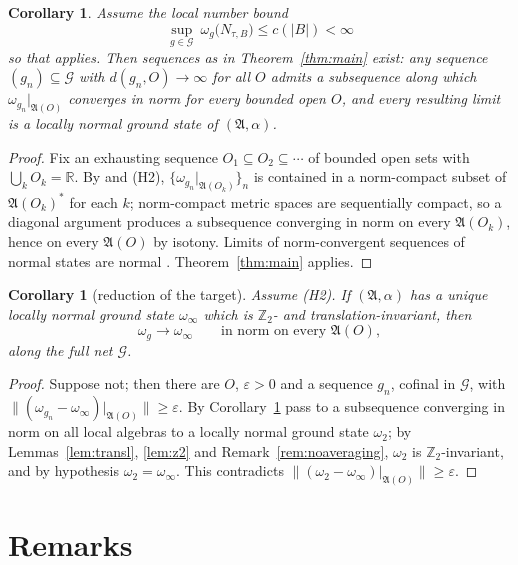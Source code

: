 \documentclass[11pt,a4paper]{article}
\theoremstyle{plain}
\newtheorem{corollary}[theorem]{Corollary}
\theoremstyle{definition}
\newcommand{\A}{\mathfrak{A}}
\newcommand{\G}{\mathcal{G}}
\newcommand{\R}{\mathbb{R}}
\newcommand{\Z}{\mathbb{Z}}
\begin{document}
\begin{corollary}\label{cor:exists}
Assume the local number bound
\[
  \sup_{g\in\G}\ \omega_g\bigl(N_{\tau,B}\bigr)\le c(|B|)<\infty \tag{H2}
\]
so that \cite[Thm.~2.3]{GJIII} applies. Then sequences as in Theorem~\ref{thm:main} exist: any
sequence $(g_n)\subseteq\G$ with $d(g_n,O)\to\infty$ for all $O$ admits a subsequence along which
$\omega_{g_n}|_{\A(O)}$ converges in norm for every bounded open $O$, and every resulting limit is
a locally normal ground state of $(\A,\alpha)$.
\end{corollary}

\begin{proof}
Fix an exhausting sequence $O_1\subseteq O_2\subseteq\cdots$ of bounded open sets with
$\bigcup_kO_k=\R$. By \cite[Thm.~2.3]{GJIII} and (H2), $\{\omega_{g_n}|_{\A(O_k)}\}_n$ is
contained in a norm-compact subset of $\A(O_k)^*$ for each $k$; norm-compact metric spaces are
sequentially compact, so a diagonal argument produces a subsequence converging in norm on every
$\A(O_k)$, hence on every $\A(O)$ by isotony. Limits of norm-convergent sequences of normal
states are normal \cite[Thm.~2.3]{GJIII}. Theorem~\ref{thm:main} applies.
\end{proof}

\begin{corollary}[reduction of the target]\label{cor:reduction}
Assume \textup{(H2)}. If $(\A,\alpha)$ has a \emph{unique} locally normal ground state
$\omega_\infty$ which is $\Z_2$- and translation-invariant, then
\[
  \omega_g\longrightarrow\omega_\infty\qquad\text{in norm on every }\A(O),
\]
along the full net $\G$.
\end{corollary}

\begin{proof}
Suppose not; then there are $O$, $\varepsilon>0$ and a sequence $g_n$, cofinal in $\G$, with
$\|(\omega_{g_n}-\omega_\infty)|_{\A(O)}\|\ge\varepsilon$. By Corollary~\ref{cor:exists} pass to a
subsequence converging in norm on all local algebras to a locally normal ground state
$\omega_2$; by Lemmas~\ref{lem:transl}, \ref{lem:z2} and Remark~\ref{rem:noaveraging}, $\omega_2$
is $\Z_2$-invariant, and by hypothesis $\omega_2=\omega_\infty$. This contradicts
$\|(\omega_2-\omega_\infty)|_{\A(O)}\|\ge\varepsilon$.
\end{proof}

\section{Remarks}
\end{document}
